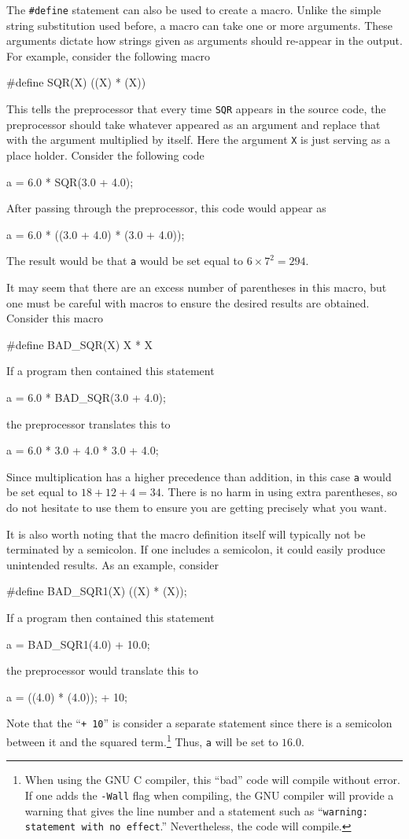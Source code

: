 The {\tt \#define} statement can also be used to create a macro.
Unlike the simple string substitution used before, a macro can take
one or more arguments.  These arguments dictate how strings given as
arguments should re-appear in the output.  For example, consider the
following macro
\begin{code}
  #define SQR(X)  ((X) * (X))
\end{code}
This tells the preprocessor that every time {\tt SQR} appears in the
source code, the preprocessor should take whatever appeared as an
argument and replace that with the argument multiplied by itself.
Here the argument {\tt X} is just serving as a place holder.  Consider
the following code
\begin{code}
  a = 6.0 * SQR(3.0 + 4.0);
\end{code}
After passing through the preprocessor, this code would appear as
\begin{code}
  a = 6.0 * ((3.0 + 4.0) * (3.0 + 4.0));
\end{code}
The result would be that {\tt a} would be set equal to $6\times7^2=294$.
	
It may seem that there are an excess number of parentheses in this
macro, but one must be careful with macros to ensure the desired
results are obtained.  Consider this macro
\begin{code}
  #define BAD_SQR(X)  X * X
\end{code}
If a program then contained this statement
\begin{code}
  a = 6.0 * BAD_SQR(3.0 + 4.0);
\end{code}
the preprocessor translates this to 
\begin{code}
  a = 6.0 * 3.0 + 4.0 * 3.0 + 4.0;
\end{code}
Since multiplication has a higher precedence than addition, in this
case {\tt a} would be set equal to $18+12+4=34$.  There is no harm in
using extra parentheses, so do not hesitate to use them to ensure
you are getting precisely what you want.  

It is also worth noting that the macro definition itself will
typically not be terminated by a semicolon.  If one includes a
semicolon, it could easily produce unintended results.  As an
example, consider
\begin{code}
  #define BAD_SQR1(X)  ((X) * (X));
\end{code}
If a program then contained this statement
\begin{code}
  a = BAD_SQR1(4.0) + 10.0;
\end{code}
the preprocessor would translate this to
\begin{code}
  a = ((4.0) * (4.0)); + 10;
\end{code}
Note that the ``{\tt + 10}'' is consider a separate statement since
there is a semicolon between it and the squared term.\footnote{When
  using the GNU C compiler, this ``bad'' code will compile without
  error.  If one adds the {\tt -Wall} flag when compiling, the GNU
  compiler will provide a warning that gives the line number and a
  statement such as ``{\tt warning: statement with no effect}.''
  Nevertheless, the code will compile.}  Thus, {\tt a} will be set to
$16.0$.

